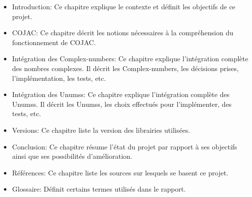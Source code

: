 \begin{itemize}
    \item Introduction: Ce chapitre explique le contexte et définit les objectifs de ce projet.
    \item \Gls{COJAC}: Ce chapitre décrit les notions nécessaires à la compréhension du fonctionnement de \gls{COJAC}.
    \item Intégration des \glspl{Complex-number}: Ce chapitre explique l'intégration complète des nombres complexes. Il décrit les  \glspl{Complex-number}, les décisions prises, l'implémentation, les tests, etc.
    \item Intégration des \glspl{Unums}: Ce chapitre explique l'intégration complète des \glspl{Unums}. Il décrit les \glspl{Unums}, les choix effectués pour l'implémenter, des tests, etc.
    \item Versions: Ce chapitre liste la version des librairies utilisées.
    \item Conclusion: Ce chapitre résume l'état du projet par rapport à ses objectifs ainsi que ses possibilités d'amélioration.
    \item Références: Ce chapitre liste les sources sur lesquels se basent ce projet.
    \item Glossaire: Définit certains termes utilisés dans le rapport.
\end{itemize}
